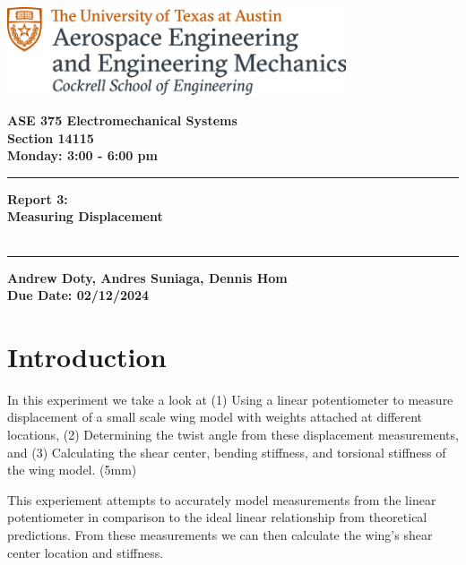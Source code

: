 \documentclass{article}
\begin{document}
\begin{titlepage}
  \centering
  \includegraphics[width=10cm]{ase-logo-formal.png}  %
  \vspace{1cm}  %
 
  \Large \textbf{ASE 375 Electromechanical Systems}\\
  \large \textbf{Section 14115}\\
  \vspace{0.5cm}
  \textbf{Monday: 3:00 - 6:00 pm}\\
 
  \vspace{1cm}
 
  \hrule
  \vspace{0.5cm}
 
  \Huge \textbf{Report 3:\\
  Measuring Displacement}\\
  \Huge \textbf{}\\
 
  \vspace{0.5cm}
  \hrule
 
  \vspace{1cm}
 
  \normalsize \textbf{Andrew Doty, Andres Suniaga, Dennis Hom}\\
  \normalsize \textbf{Due Date: 02/12/2024}
 
\end{titlepage}
\newpage

\tableofcontents
\thispagestyle{empty}
\newpage

\section{Introduction}
In this experiment we take a look at (1) Using a linear potentiometer to measure displacement of a small scale wing model with weights attached at different locations, (2) Determining the twist angle from these displacement measurements, and (3) Calculating the shear center, bending stiffness, and torsional stiffness of the wing model. 
\vspace(5mm)

This experiement attempts to accurately model measurements from the linear potentiometer in comparison to the ideal linear relationship from theoretical predictions. From these measurements we can then calculate the wing's shear center location and stiffness.  
\end{document}
